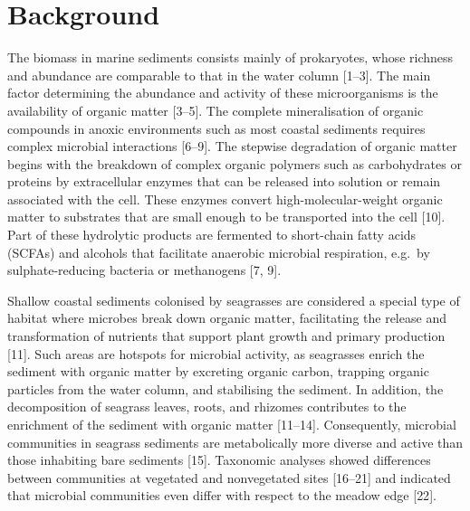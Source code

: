 \documentclass[
  12 pt,
]{article}
\begin{document}
\hypertarget{background}{%
\section{Background}\label{background}}

The biomass in marine sediments consists mainly of prokaryotes, whose richness and abundance are comparable to that in the water column {[}1--3{]}. The main factor determining the abundance and activity of these microorganisms is the availability of organic matter {[}3--5{]}. The complete mineralisation of organic compounds in anoxic environments such as most coastal sediments requires complex microbial interactions {[}6--9{]}. The stepwise degradation of organic matter begins with the breakdown of complex organic polymers such as carbohydrates or proteins by extracellular enzymes that can be released into solution or remain associated with the cell. These enzymes convert high-molecular-weight organic matter to substrates that are small enough to be transported into the cell {[}10{]}. Part of these hydrolytic products are fermented to short-chain fatty acids (SCFAs) and alcohols that facilitate anaerobic microbial respiration, e.g.~by sulphate-reducing bacteria or methanogens {[}7, 9{]}.

Shallow coastal sediments colonised by seagrasses are considered a special type of habitat where microbes break down organic matter, facilitating the release and transformation of nutrients that support plant growth and primary production {[}11{]}. Such areas are hotspots for microbial activity, as seagrasses enrich the sediment with organic matter by excreting organic carbon, trapping organic particles from the water column, and stabilising the sediment. In addition, the decomposition of seagrass leaves, roots, and rhizomes contributes to the enrichment of the sediment with organic matter {[}11--14{]}. Consequently, microbial communities in seagrass sediments are metabolically more diverse and active than those inhabiting bare sediments {[}15{]}. Taxonomic analyses showed differences between communities at vegetated and nonvegetated sites {[}16--21{]} and indicated that microbial communities even differ with respect to the meadow edge {[}22{]}.
\end{document}
